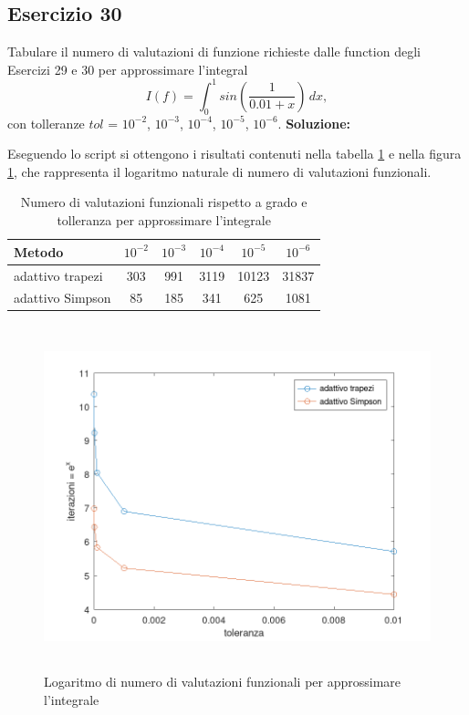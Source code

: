 \subsection{Esercizio 30}
Tabulare il numero di valutazioni di funzione richieste dalle function
degli Esercizi 29 e 30 per approssimare l'integral
\[
    I(f) = \int_{0}^{1} sin\left(\frac{1}{0.01+x}\right)\,dx,
\]
con tolleranze $tol$ = $10^{-2}$, $10^{-3}$, $10^{-4}$, $10^{-5}$, $10^{-6}$.
\newline \textbf{Soluzione:}

Eseguendo lo script  si ottengono i risultati contenuti nella
tabella \ref{tab:30} e nella figura \ref{fig:es30}, che rappresenta il
logaritmo naturale di numero di valutazioni funzionali.
\begin{table}[ht]
    \centering
    \renewcommand\arraystretch{2}
    \begin{tabular}{| l | c c c c c |}
        \hline
        Metodo           & $10^{-2}$ & $10^{-3}$ & $10^{-4}$ & $10^{-5}$ & $10^{-6}$ \\
        \hline
        adattivo trapezi & 303       & 991       & 3119      & 10123     & 31837     \\
        adattivo Simpson & 85        & 185       & 341       & 625       & 1081      \\
        \hline
    \end{tabular}
    \caption{Numero di valutazioni funzionali rispetto a grado e tolleranza per approssimare l'integrale}
    \label{tab:30}
\end{table}
\FloatBarrier
\begin{figure}[!ht]
    \centering
    \includegraphics[width=16cm,height=10cm,keepaspectratio]{capitolo5/es30_figure.png}
    \caption{Logaritmo di numero di valutazioni funzionali per approssimare l'integrale}
    \label{fig:es30}
\end{figure}
\FloatBarrier

